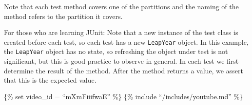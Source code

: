 \begin{Shaded}
\begin{Highlighting}[]
 

    \NormalTok{();}

    \NormalTok{() \{}
    \NormalTok{(}\NormalTok{);}
\NormalTok{  \}}

    \NormalTok{() \{}
    \NormalTok{(}\NormalTok{);}
\NormalTok{  \}}

    \NormalTok{() \{}
    \NormalTok{(}\NormalTok{);}
\NormalTok{  \}}

    \NormalTok{() \{}
    \NormalTok{(}\NormalTok{);}
\NormalTok{  \}}
\NormalTok{\}}
\end{Highlighting}
\end{Shaded}

Note that each test method covers one of the partitions and the naming
of the method refers to the partition it covers.

For those who are learning JUnit: Note that a new instance of the test
class is created before each test, so each test has a new
\texttt{LeapYear} object. In this example, the \texttt{LeapYear} object
has no state, so refreshing the object under test is not significant,
but this is good practice to observe in general. In each test we first
determine the result of the method. After the method returns a value, we
assert that this is the expected value.

\{\% set video\_id = ``mXmFiiifwaE'' \%\} \{\% include
``/includes/youtube.md'' \%\}


